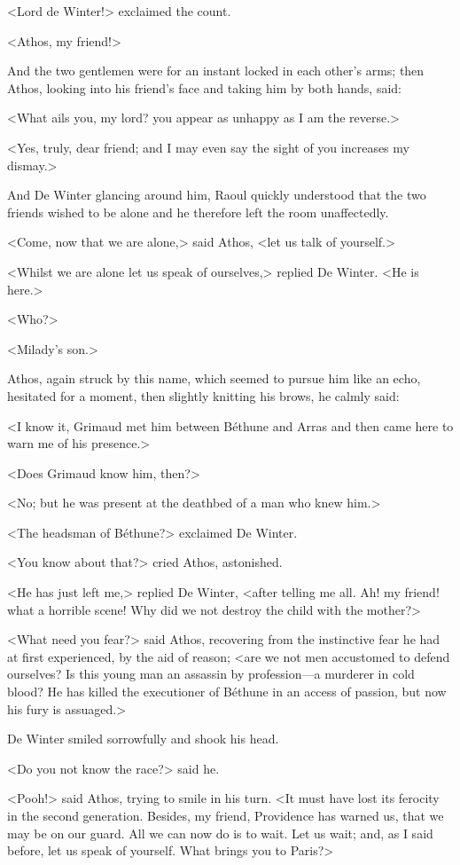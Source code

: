 <Lord de Winter!> exclaimed the count.

<Athos, my friend!>

And the two gentlemen were for an instant locked in each other's arms; then Athos, looking into his friend's face and taking him by both hands, said:

<What ails you, my lord? you appear as unhappy as I am the reverse.>

<Yes, truly, dear friend; and I may even say the sight of you increases my dismay.>

And De Winter glancing around him, Raoul quickly understood that the two friends wished to be alone and he therefore left the room unaffectedly.

<Come, now that we are alone,> said Athos, <let us talk of yourself.>

<Whilst we are alone let us speak of ourselves,> replied De Winter. <He is here.>

<Who?>

<Milady's son.>

Athos, again struck by this name, which seemed to pursue him like an echo, hesitated for a moment, then slightly knitting his brows, he calmly said:

<I know it, Grimaud met him between Béthune and Arras and then came here to warn me of his presence.>

<Does Grimaud know him, then?>

<No; but he was present at the deathbed of a man who knew him.>

<The headsman of Béthune?> exclaimed De Winter.

<You know about that?> cried Athos, astonished.

<He has just left me,> replied De Winter, <after telling me all. Ah! my friend! what a horrible scene! Why did we not destroy the child with the mother?>

<What need you fear?> said Athos, recovering from the instinctive fear he had at first experienced, by the aid of reason; <are we not men accustomed to defend ourselves? Is this young man an assassin by profession—a murderer in cold blood? He has killed the executioner of Béthune in an access of passion, but now his fury is assuaged.>

De Winter smiled sorrowfully and shook his head.

<Do you not know the race?> said he.

<Pooh!> said Athos, trying to smile in his turn. <It must have lost its ferocity in the second generation. Besides, my friend, Providence has warned us, that we may be on our guard. All we can now do is to wait. Let us wait; and, as I said before, let us speak of yourself. What brings you to Paris?>

